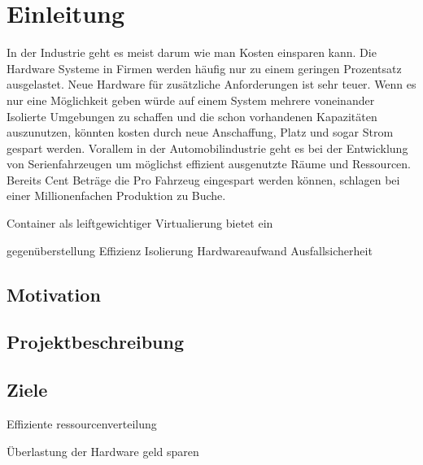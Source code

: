 \thispagestyle{empty}
\section{Einleitung}
In der Industrie geht es meist darum wie man Kosten einsparen kann. Die Hardware Systeme in Firmen werden häufig nur zu einem geringen Prozentsatz ausgelastet. Neue Hardware für zusätzliche Anforderungen ist sehr teuer. Wenn es nur eine Möglichkeit geben würde auf einem System mehrere voneinander Isolierte Umgebungen zu schaffen und die schon vorhandenen Kapazitäten auszunutzen, könnten kosten durch neue Anschaffung, Platz und sogar Strom gespart werden. Vorallem in der Automobilindustrie geht es bei der Entwicklung von Serienfahrzeugen um möglichst effizient ausgenutzte Räume und Ressourcen. Bereits Cent Beträge die Pro Fahrzeug eingespart werden können, schlagen bei einer Millionenfachen Produktion zu Buche. 

Container als leiftgewichtiger Virtualierung bietet ein 

gegenüberstellung Effizienz Isolierung 
Hardwareaufwand
Ausfallsicherheit 

\subsection{Motivation}
\subsection{Projektbeschreibung}
\subsection{Ziele}

Effiziente ressourcenverteilung 

Überlastung der Hardware
geld sparen 




\pagebreak